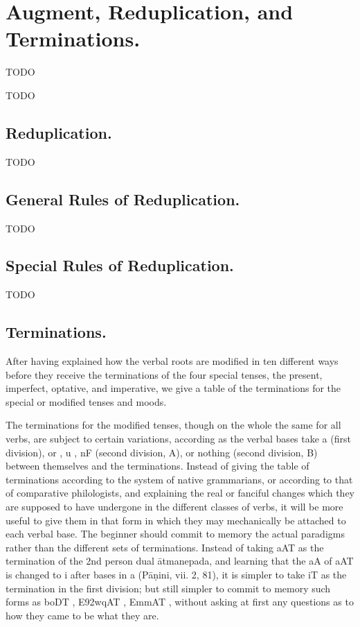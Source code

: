 \def\DevnagVersion{2.17}%
\chapter{Augment, Reduplication, and Terminations.}

\s TODO

\s TODO

\section{Reduplication.}

\s TODO

\section{General Rules of Reduplication.}

\s TODO

\section{Special Rules of Reduplication.}

\s TODO

\section{Terminations.}

\s After having explained how the verbal roots are modified in ten
different ways before they receive the terminations of the four special
tenses, the present, imperfect, optative, and imperative, we give a
table of the terminations for the special or modified tenses and moods.

\s The terminations for the modified tenses, though on the whole the
same for all verbs, are subject to certain variations, according as the
verbal bases take {\dn a}  (first division), or {\dn {}} , {\dn u}
, {\dn nF}  (second division, A), or nothing (second division,
B) between themselves and the terminations. Instead of giving the table
of terminations according to the system of native grammarians, or
according to that of comparative philologists, and explaining the real
or fanciful changes which they are supposed to have undergone in the
different classes of verbs, it will be more useful to give them in that
form in which they may mechanically be attached to each verbal base. The
beginner should commit to memory the actual paradigms rather than the
different sets of terminations. Instead of taking {\dn aAT\?}  as
the termination of the 2nd person dual ātmanepada, and learning that the
{\dn aA}  of {\dn aAT\?}  is changed to {\dn i}  after bases in
{\dn a}  (Pāṇini, vii. 2, 81), it is simpler to take {\dn iT\?} 
as the termination in the first division; but still simpler to commit to
memory such forms as {\dn boD\?T\?} , {\dn E\392wqAT\?}
, {\dn EmmAT\?} , without asking at first any
questions as to how they came to be what they are.

